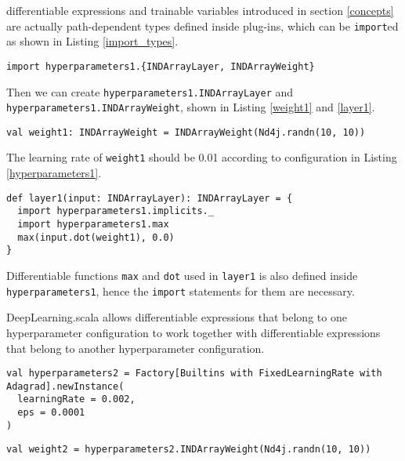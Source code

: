 \Glspl{differentiable expression} and \glspl{trainable variable} introduced in section \ref{concepts} are actually path-dependent types\cite{amin2014foundations} defined inside \glspl{plug-in}, which can be \lstinline{import}ed as shown in Listing \ref{import_types}.

\begin{lstlisting}[caption={Importing \Glspl{differentiable expression} and \glspl{trainable variable} types}, label={import_types}]
import hyperparameters1.{INDArrayLayer, INDArrayWeight}
\end{lstlisting}

Then we can create \lstinline{hyperparameters1.INDArrayLayer} and \lstinline{hyperparameters1.INDArrayWeight}, shown in Listing \ref{weight1} and \ref{layer1}.

\begin{lstlisting}[caption={\Glspl{trainable variable} that belong to \lstinline{hyperparameter1}}, label={weight1}]
val weight1: INDArrayWeight = INDArrayWeight(Nd4j.randn(10, 10))
\end{lstlisting}

The learning rate of \lstinline{weight1} should be 0.01 according to configuration in Listing \ref{hyperparameters1}.

\begin{lstlisting}[caption={\Glspl{differentiable expression} that belong to \lstinline{hyperparameter1}}, label={layer1}]
def layer1(input: INDArrayLayer): INDArrayLayer = {
  import hyperparameters1.implicits._
  import hyperparameters1.max
  max(input.dot(weight1), 0.0)
}
\end{lstlisting}

Differentiable functions \lstinline{max} and \lstinline{dot} used in \lstinline{layer1} is also defined inside \lstinline{hyperparameters1}, hence the \lstinline{import} statements for them are necessary.

DeepLearning.scala allows \glspl{differentiable expression} that belong to one hyperparameter configuration to work together with \glspl{differentiable expression} that belong to another hyperparameter configuration. 

\begin{lstlisting}[caption={Hyperparameters for Adagrad}, label={hyperparameters2}]
val hyperparameters2 = Factory[Builtins with FixedLearningRate with Adagrad].newInstance(
  learningRate = 0.002,
  eps = 0.0001
)
\end{lstlisting}

\begin{lstlisting}[caption={\Glspl{trainable variable} optimized by Adagrad}, label={weight2}]
val weight2 = hyperparameters2.INDArrayWeight(Nd4j.randn(10, 10))
\end{lstlisting}

